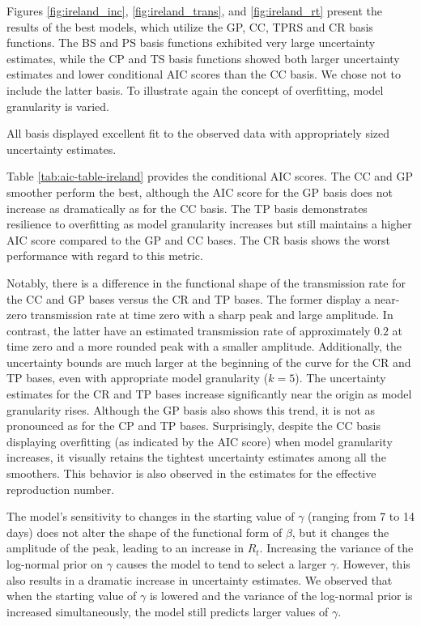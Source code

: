 \documentclass[
11pt, %
oneside, %
english, %
singlespacing, %
]{macthesis} %
\begin{document}
Figures \ref{fig:ireland_inc}, \ref{fig:ireland_trans}, and \ref{fig:ireland_rt} present the results of the best models, which utilize the GP, CC, TPRS and CR basis functions. The BS and PS basis functions exhibited very large uncertainty estimates, while the CP and TS basis functions showed both larger uncertainty estimates and lower conditional AIC scores than the CC basis. We chose not to include the latter basis. To illustrate again the concept of overfitting, model granularity is varied.

All basis displayed excellent fit to the observed data with appropriately sized uncertainty estimates.

Table \ref{tab:aic-table-ireland} provides the conditional AIC scores. The CC and GP smoother perform the best, although the AIC score for the GP basis does not increase as dramatically as for the CC basis. The TP basis demonstrates resilience to overfitting as model granularity increases but still maintains a higher AIC score compared to the GP and CC bases. The CR basis shows the worst performance with regard to this metric.

Notably, there is a difference in the functional shape of the transmission rate for the CC and GP bases versus the CR and TP bases. The former display a near-zero transmission rate at time zero with a sharp peak and large amplitude. In contrast, the latter have an estimated transmission rate of approximately \(0.2\) at time zero and a more rounded peak with a smaller amplitude. Additionally, the uncertainty bounds are much larger at the beginning of the curve for the CR and TP bases, even with appropriate model granularity (\(k=5\)). The uncertainty estimates for the CR and TP bases increase significantly near the origin as model granularity rises. Although the GP basis also shows this trend, it is not as pronounced as for the CP and TP bases. Surprisingly, despite the CC basis displaying overfitting (as indicated by the AIC score) when model granularity increases, it visually retains the tightest uncertainty estimates among all the smoothers. This behavior is also observed in the estimates for the effective reproduction number.

The model's sensitivity to changes in the starting value of \(\gamma\) (ranging from 7 to 14 days) does not alter the shape of the functional form of \(\beta\), but it changes the amplitude of the peak, leading to an increase in \(R_t\). Increasing the variance of the log-normal prior on \(\gamma\) causes the model to tend to select a larger \(\gamma\). However, this also results in a dramatic increase in uncertainty estimates. We observed that when the starting value of \(\gamma\) is lowered and the variance of the log-normal prior is increased simultaneously, the model still predicts larger values of \(\gamma\).
\end{document}
